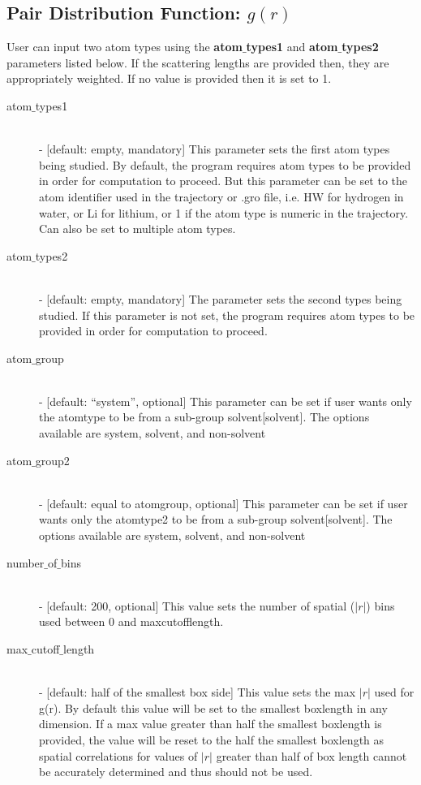 \documentclass{article}
\begin{document}
\subsection{Pair Distribution Function: $g(r)$} \label{sec::gofr_parm}
User can input two atom types using the \textbf{atom$\_$types1} and \textbf{atom$\_$types2} parameters listed below.  If the scattering lengths are provided then, they are appropriately weighted. If no value is provided then it is set to 1.
\begin{description}	
	\item[atom$\_$types1] \hfill \\
	- [default: empty, mandatory] This parameter sets the first atom types being studied.  By default, the program requires atom types to be provided in order for computation to proceed.  But this parameter can be set to the atom identifier used in the trajectory or .gro file, i.e. HW for hydrogen in water, or Li for lithium, or 1 if the atom type is numeric in the trajectory.  Can also be set to multiple atom types.
	
	\item[atom$\_$types2] \hfill \\
	- [default: empty, mandatory] The parameter sets the second types being studied.  If this parameter is not set, the program requires atom types to be provided in order for computation to proceed.
	
	\item[atom$\_$group] \hfill \\
	- [default: ``system'', optional] This parameter can be set if user wants only the atomtype to be from a sub-group solvent[solvent].  The options available are system, solvent, and non-solvent
	
	\item[atom$\_$group2] \hfill \\
	- [default: equal to atomgroup, optional] This parameter can be set if user wants only the atomtype2 to be from a sub-group solvent[solvent].  The options available are system, solvent, and non-solvent
		
	\item[number$\_$of$\_$bins] \hfill \\
	- [default: 200, optional] This value sets the number of spatial ($|r|$) bins used between 0 and maxcutofflength.
	
	\item[max$\_$cutoff$\_$length] \hfill \\
	- [default: half of the smallest box side] This value sets the max $|r|$ used for g(r).  By default this value will be set to the smallest boxlength in any dimension.  If a max value greater than half the smallest boxlength is provided, the value will be reset to the half the smallest boxlength as spatial correlations for values of $|r|$ greater than half of box length cannot be accurately determined and thus should not be used.
	
\end{description}
\end{document}
